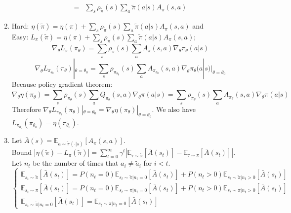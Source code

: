 \documentclass[a4paper]{article}
\begin{document}
\begin{enumerate}
\begin{align*}
            =& \sum^{}_{s} \rho_{\tilde\pi}(s) \sum^{}_{a} \tilde \pi(a|s) A_\pi(s,a)
        \end{align*}
    \item Hard: $ \eta(\tilde\pi) = \eta(\pi) + \sum^{}_{s} \rho_{\tilde\pi}(s) \sum^{}_{a} \tilde\pi(a|s) A_{\pi}(s,a)$ and \\
        Easy: $ L_{\pi}(\tilde \pi) = \eta(\pi) + \sum^{}_{s} \rho_{\pi}(s) \sum^{}_{a} \tilde\pi(a|s) A_{\pi}(s,a) $;
        \[
            \nabla_{\theta}L_{\pi}(\pi_\theta) = \sum^{}_{s} \rho_{\pi}(s) \sum^{}_{a} A_{\pi}(s,a) \nabla_{\theta}\pi_{\theta}(a|s)
        \]
        \[
            \nabla_{\theta}L_{\pi_{\theta_0}}(\pi_\theta) | _{\theta = \theta_0} = \sum^{}_{s} \rho_{\pi_{\theta_0}}(s) \sum^{}_{a} A_{\pi_{\theta_0}}(s,a) \nabla_{\theta}\pi_{\theta}(a|s)|_{\theta=\theta_0}
        \]
        Because policy gradient theorem:
        \[
            \nabla_\theta \eta(\pi_{\theta}) = \sum^{}_{s} \rho_{\pi_{\theta}}(s) \sum^{}_{a} Q_{\pi_{\theta}}(s,a) \nabla_{\theta}\pi(a|s) = \sum^{}_{s} \rho_{\pi_{\theta}}(s) \sum^{}_{a} A_{\pi_{\theta}}(s,a) \nabla_{\theta}\pi(a|s)
        \]
        Therefore $ \nabla_{\theta} L_{\pi_{\theta_0}}(\pi_\theta)|_{\theta=\theta_0} = \nabla_{\theta}\eta(\pi_\theta)|_{\theta = \theta_0} $. We also have $ L_{\pi_{\theta_0}}(\pi_{\theta_0}) = \eta(\pi_{\theta_0}) $.
    \item Let $ \bar A(s) = \mathbb{E}_{a \sim \tilde \pi(\cdot | s)}\left[ A_\pi(s,a) \right] $.\\
        Bound $ \left| \eta(\tilde \pi) - L_{\pi}(\tilde \pi) \right| = \sum^{\infty}_{t=0} \gamma^{t} \left| \mathbb{E}_{\tau\sim\tilde\pi}\left[ \bar A(s_t) \right] - \mathbb{E}_{\tau\sim\pi}[\bar A(s_t) ]\right|$.\\
        Let $ n_t $ be the number of times that $ a_i \ne \tilde a_i $ for $ i < t $.\\
        \[
            \begin{cases}
                \mathbb{E}_{s_t\sim\tilde\pi}[\bar A(s_t)] = P(n_t=0)\mathbb{E}_{s_t \sim \tilde\pi | n_t = 0}[\bar A(s_t)] + P(n_t>0)\mathbb{E}_{s_t \sim \tilde\pi | n_t > 0}[\bar A(s_t)]\\
                \mathbb{E}_{s_t\sim\pi}[\bar A(s_t)] = P(n_t=0)\mathbb{E}_{s_t \sim \pi | n_t = 0}[\bar A(s_t)] + P(n_t>0)\mathbb{E}_{s_t \sim \pi | n_t > 0}[\bar A(s_t)]\\
                \mathbb{E}_{s_t \sim \tilde\pi | n_t = 0}[\bar A(s_t)] =\mathbb{E}_{s_t \sim \pi | n_t = 0}[\bar A(s_t)] 
            \end{cases}
\]
\end{enumerate}
\end{document}
